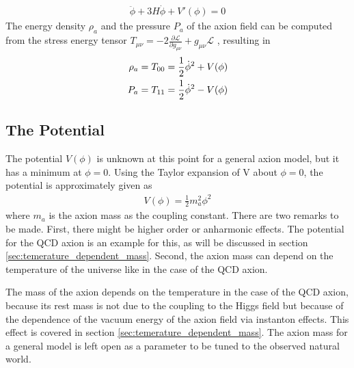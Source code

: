 \documentclass[a4paper, 12pt]{article}
\begin{document}
\begin{align}
    \label{eq:eom}
    \ddot{\phi} + 3 H \dot{\phi} + V'(\phi) = 0
\end{align}
The energy density $\rho_a$ and the pressure $P_a$ of the axion field
can be computed from the stress energy tensor
$T_{\mu \nu} = -2 \frac{\partial \mathcal{L}}{\partial g_{\mu \nu}} + g_{\mu \nu} \mathcal{L}$
\cite[Sec. 3.3, Page 161, Eq. 3.21]{ClassicalFieldTheory}
, resulting in \cite[Sec. 4.2, Page. 25]{MarshAxionCosmo}
\begin{align}
    \label{eq:axion_energy_density_and_pressure}
    \notag \rho_a &= T_{00} %
     =  \frac{1}{2} \dot{\phi}^2 + V(\phi) \\
    P_a &= T_{11} %
    = \frac{1}{2} \dot{\phi}^2 - V(\phi)
\end{align}

\subsection{The Potential}
The potential $V(\phi)$ is unknown at this point for a general axion model, but it has a minimum
at $\phi = 0$. Using the Taylor expansion of V about $\phi = 0$, the potential is approximately given as
\begin{align}
    \label{eq:potential}
    V(\phi) = \frac{1}{2} m_a^2 \phi^2
\end{align}
where $m_a$ is the axion mass as the coupling constant.
There are two remarks to be made.
First, there might be higher order or anharmonic effects.
The potential for the QCD axion is an example for this, as will be discussed in section \ref{sec:temerature_dependent_mass}.
Second, the axion mass can depend on the temperature of the universe like in the case of the QCD axion.

The mass of the axion depends on the temperature in the case of the QCD axion, because its rest mass is not due
to the coupling to the Higgs field but because of the dependence of the vacuum energy of the axion field
via instanton effects.
This effect is covered in section \ref{sec:temerature_dependent_mass}.
The axion mass for a general model is left open as a parameter to be tuned to the observed
natural world.
\end{document}
